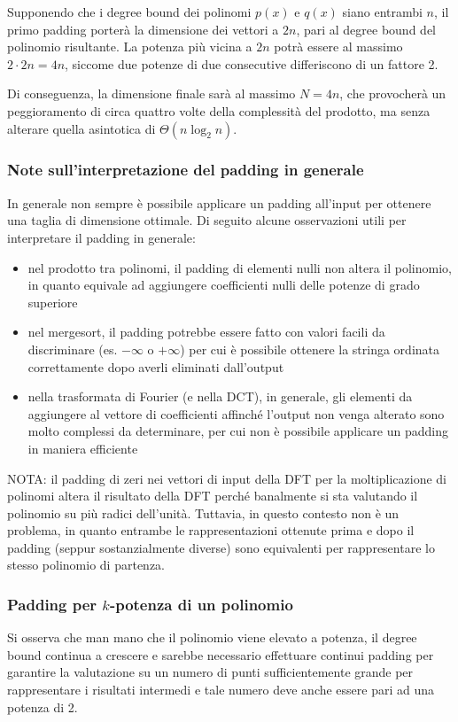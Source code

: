 Supponendo che i degree bound dei polinomi \(p(x)\) e \(q(x)\) siano entrambi \(n\), il primo padding porterà la
dimensione dei vettori a \(2n\), pari al degree bound del polinomio risultante. La potenza più vicina a \(2n\) potrà
essere al massimo \(2 \cdot 2n = 4n\), siccome due potenze di due consecutive differiscono di un fattore 2.

Di conseguenza, la dimensione finale sarà al massimo \(N = 4n\), che provocherà un peggioramento di circa quattro volte
della complessità del prodotto, ma senza alterare quella asintotica di \(\Theta(n \log_2 n)\).

\subsubsection*{Note sull'interpretazione del padding in generale}
In generale non sempre è possibile applicare un padding all'input per ottenere una taglia di dimensione ottimale. Di seguito
alcune osservazioni utili per interpretare il padding in generale:
\begin{itemize}
	\item nel prodotto tra polinomi, il padding di elementi nulli non altera il polinomio, in quanto equivale ad aggiungere
	coefficienti nulli delle potenze di grado superiore
	\item nel mergesort, il padding potrebbe essere fatto con valori facili da discriminare (es. \(-\infty\) o \(+\infty\))
	per cui è possibile ottenere la stringa ordinata correttamente dopo averli eliminati dall'output
	\item nella trasformata di Fourier (e nella DCT), in generale, gli elementi da aggiungere al vettore di coefficienti
	affinché l'output non venga alterato sono molto complessi da determinare, per cui non è possibile applicare un padding
	in maniera efficiente
\end{itemize}

\noindent
NOTA: il padding di zeri nei vettori di input della DFT per la moltiplicazione di polinomi altera il risultato della DFT
perché banalmente si sta valutando il polinomio su più radici dell'unità. Tuttavia, in questo contesto non è un problema,
in quanto entrambe le rappresentazioni ottenute prima e dopo il padding (seppur sostanzialmente diverse) sono equivalenti
per rappresentare lo stesso polinomio di partenza.

\subsubsection*{Padding per \(k\)-potenza di un polinomio}
Si osserva che man mano che il polinomio viene elevato a potenza, il degree bound continua a crescere e sarebbe necessario
effettuare continui padding per garantire la valutazione su un numero di punti sufficientemente grande per rappresentare
i risultati intermedi e tale numero deve anche essere pari ad una potenza di 2.

